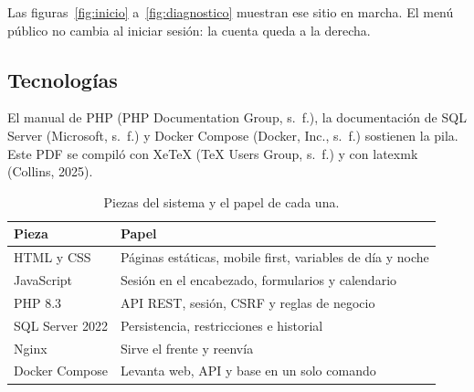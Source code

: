 Las figuras~\ref{fig:inicio} a~\ref{fig:diagnostico} muestran ese sitio en
marcha. El menú público no cambia al iniciar sesión: la cuenta queda a la
derecha.







\subsection{Tecnologías}

El manual de PHP (PHP Documentation Group, s.~f.), la documentación de
SQL Server (Microsoft, s.~f.) y Docker Compose (Docker, Inc., s.~f.)
sostienen la pila. Este PDF se compiló con XeTeX (TeX Users Group, s.~f.)
y con latexmk (Collins, 2025).

\begin{table}[H]
  \centering
  \caption{Piezas del sistema y el papel de cada una.}
  \label{tab:tecnologias}
  \small
  \begin{tabularx}{\textwidth}{@{}l Y@{}}
    \toprule
    Pieza & Papel \\
    \midrule
    HTML y CSS & Páginas estáticas, mobile first, variables de día y noche \\
    JavaScript & Sesión en el encabezado, formularios y calendario \\
    PHP 8.3 & API REST, sesión, CSRF y reglas de negocio \\
    SQL Server 2022 & Persistencia, restricciones e historial \\
    Nginx & Sirve el frente y reenvía  \\
    Docker Compose & Levanta web, API y base en un solo comando \\
    \bottomrule
  \end{tabularx}
\end{table}

